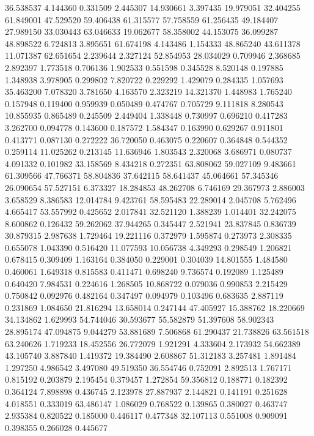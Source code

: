 36.538537
4.144360
0.331509
2.445307
14.930661
3.397435
19.979051
32.404255
61.849001
47.529520
59.406438
61.315577
57.758559
61.256435
49.184407
27.989150
33.030443
63.046633
19.062677
58.358002
44.153075
36.099287
48.898522
6.724813
3.895651
61.674198
4.143486
1.154333
48.865240
43.611378
11.071387
62.651654
2.239644
2.327124
52.854953
28.034029
0.709946
2.368685
2.892397
1.773518
0.706136
1.902533
0.551598
0.345528
8.520148
0.197885
1.348938
3.978905
0.299802
7.820722
0.229292
1.429079
0.284335
1.057693
35.463200
7.078320
3.781650
4.163570
2.323219
14.321370
1.448983
1.765240
0.157948
0.119400
0.959939
0.050489
0.474767
0.705729
9.111818
8.280543
10.855935
0.865489
0.245509
2.449404
1.338448
0.730997
0.696210
0.417283
3.262700
0.094778
0.143600
0.187572
1.584347
0.163990
0.629267
0.911801
0.413771
0.087130
0.272222
36.720050
0.463075
0.220607
0.364848
0.544352
0.259114
11.025262
0.213145
11.636946
1.803543
2.320068
3.686971
0.080737
4.091332
0.101982
33.158569
8.434218
0.272351
63.808062
59.027109
9.483661
61.309566
47.766371
58.804836
37.642115
58.641437
45.064661
57.345346
26.090654
57.527151
6.373327
18.284853
48.262708
6.746169
29.367973
2.886003
3.658529
8.386583
12.014784
9.423761
58.595483
22.289014
2.045708
5.762496
4.665417
53.557992
0.425652
2.017841
32.521120
1.388239
1.014401
32.242075
8.600862
0.126432
59.262062
37.944265
0.345447
2.521941
23.837845
0.836739
30.879315
2.987638
1.729464
19.221116
0.372979
1.595874
0.273973
2.308335
0.655078
1.043390
0.516420
11.077593
10.056738
4.349293
0.298549
1.206821
0.678415
0.309409
1.163164
0.384050
0.229001
0.304039
14.801555
1.484580
0.460061
1.649318
0.815583
0.411471
0.698240
9.736574
0.192089
1.125489
0.640420
7.984531
0.224616
1.268505
10.868722
0.079036
0.990853
2.215429
0.750842
0.092976
0.482164
0.347497
0.094979
0.103496
0.683635
2.887119
0.231869
1.084650
21.816294
13.658014
0.247144
47.405927
15.388762
18.220669
34.134862
1.629993
54.744046
30.593677
55.582879
51.397608
58.902343
28.895174
47.094875
9.044279
53.881689
7.506868
61.290437
21.738826
63.561518
63.240626
1.719233
18.452556
26.772079
1.921291
4.333604
2.173932
54.662389
43.105740
3.887840
1.419372
19.384490
2.608867
51.312183
3.257481
1.891484
1.297250
4.986542
3.497080
49.519350
36.554746
0.752091
2.892513
1.767171
0.815192
0.203879
2.195454
0.379457
1.272854
59.356812
0.188771
0.182392
0.364124
7.898898
0.436745
2.123978
27.887937
2.144821
0.141191
0.251628
4.018551
0.333019
63.486147
1.086029
0.768522
0.139865
0.380027
0.463747
2.935384
0.820522
0.185000
0.446117
0.477348
32.107113
0.551008
0.909091
0.398355
0.266028
0.445677
